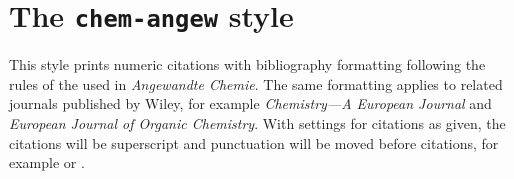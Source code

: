 \documentclass[a4paper]{article}
\begin{document}
\section*{The \texttt{chem-angew} style}

This style prints numeric citations with bibliography
formatting following the rules of the used in \emph{Angewandte
Chemie}. The same formatting applies to related journals
published by Wiley, for example \emph{Chemistry---A European
Journal} and \emph{European Journal of Organic Chemistry}. With
settings for citations as given, the citations will be
superscript and punctuation will be moved before citations, for
example \autocite{Kabbe1973} or \cite{Arduengo1991}.

\nocite{*}

\printbibliography
\end{document}
